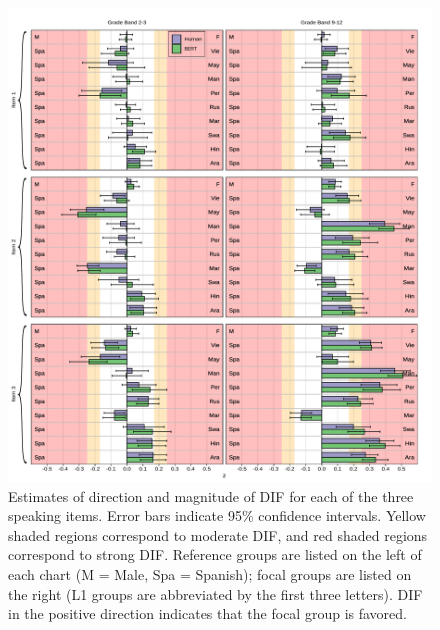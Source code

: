\documentclass [PhD] {uclathes}
\begin{document}
\begin{figure}[t]
    \centering
    \includegraphics[width=16cm]{figures/20230422_ETS-DIF_z_itm_edit.pdf}
    \caption{Estimates of direction and magnitude of DIF for each of the three speaking items. Error bars indicate 95\% confidence intervals. Yellow shaded regions correspond to moderate DIF, and red shaded regions correspond to strong DIF. Reference groups are listed on the left of each chart (M = Male, Spa = Spanish); focal groups are listed on the right (L1 groups are abbreviated by the first three letters). DIF in the positive direction indicates that the focal group is favored.}
    \label{fig:z_itm}
\end{figure}


%
%
%

\end{document}
